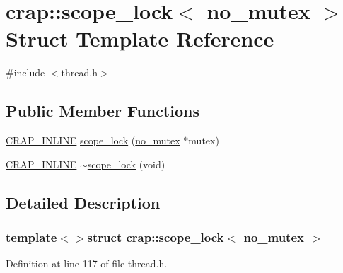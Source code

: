 \hypertarget{structcrap_1_1scope__lock_3_01no__mutex_01_4}{\section{crap\+:\+:scope\+\_\+lock$<$ no\+\_\+mutex $>$ Struct Template Reference}
\label{structcrap_1_1scope__lock_3_01no__mutex_01_4}
}


{\ttfamily \#include $<$thread.\+h$>$}

\subsection*{Public Member Functions}
\begin{DoxyCompactItemize}
\item 
\hyperlink{config__x86_8h_a5a40526b8d842e7ff731509998bb0f1c}{C\+R\+A\+P\+\_\+\+I\+N\+L\+I\+N\+E} \hyperlink{structcrap_1_1scope__lock_3_01no__mutex_01_4_a70fc64b20e73f3311c0e86270cc8714e}{scope\+\_\+lock} (\hyperlink{structcrap_1_1no__mutex}{no\+\_\+mutex} $\ast$mutex)
\item 
\hyperlink{config__x86_8h_a5a40526b8d842e7ff731509998bb0f1c}{C\+R\+A\+P\+\_\+\+I\+N\+L\+I\+N\+E} \hyperlink{structcrap_1_1scope__lock_3_01no__mutex_01_4_a4b39f2ddc9942d59448c669840f8a5ba}{$\sim$scope\+\_\+lock} (void)
\end{DoxyCompactItemize}


\subsection{Detailed Description}
\subsubsection*{template$<$$>$struct crap\+::scope\+\_\+lock$<$ no\+\_\+mutex $>$}



Definition at line 117 of file thread.\+h.



